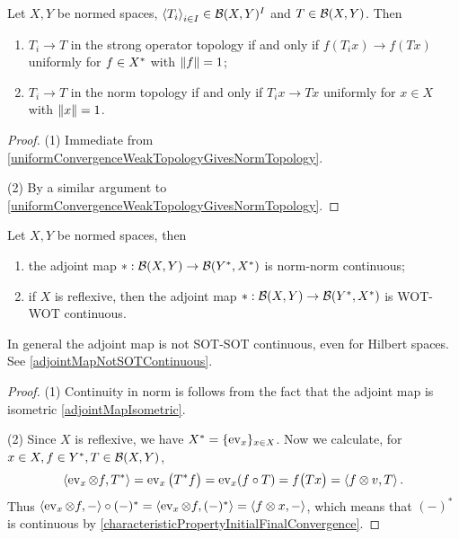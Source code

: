 \begin{lemma}
Let $X, Y$ be normed spaces, $\left\langle T_i \right\rangle_{i\in I} \in \operatorname{\mathcal{B}}(X, Y)^I$ and $T \in \operatorname{\mathcal{B}}(X, Y)$. Then
\begin{enumerate}
\item $T_i \to T$ in the strong operator topology \textup{if and only if} $f(T_ix) \to f(Tx)$ uniformly for $f\in{X}^*$ with $\lVert f\rVert = 1$;
\item $T_i \to T$ in the norm topology \textup{if and only if} $T_ix\to Tx$ uniformly for $x\in X$ with $\lVert x\rVert = 1$.
\end{enumerate}
\end{lemma}
\begin{proof}
(1) Immediate from \ref{uniformConvergenceWeakTopologyGivesNormTopology}.

(2) By a similar argument to \ref{uniformConvergenceWeakTopologyGivesNormTopology}.
\end{proof}

\begin{proposition}
Let $X,Y$ be normed spaces, then
\begin{enumerate}
\item the adjoint map $*: \operatorname{\mathcal{B}}(X, Y) \to \operatorname{\mathcal{B}}({Y}^*, {X}^*)$ is norm-norm continuous;
\item if $X$ is reflexive, then the adjoint map $*: \operatorname{\mathcal{B}}(X, Y) \to \operatorname{\mathcal{B}}({Y}^*, {X}^*)$ is WOT-WOT continuous.
\end{enumerate}
\end{proposition}
In general the adjoint map is not SOT-SOT continuous, even for Hilbert spaces. See \ref{adjointMapNotSOTContinuous}.
\begin{proof}
(1) Continuity in norm is follows from the fact that the adjoint map is isometric \ref{adjointMapIsometric}.

(2) Since $X$ is reflexive, we have ${X}^*= \{\operatorname{ev}_x\}_{x\in X}$. Now we calculate, for $x\in X, f\in {Y}^*, T\in \operatorname{\mathcal{B}}(X,Y)$,
\[ \left\langle \operatorname{ev}_x\otimes f, T^* \right\rangle = \operatorname{ev}_x\big(T^*f\big) = \operatorname{ev}_x(f\circ T) = f\big(Tx\big) = \left\langle f\otimes v, T \right\rangle. \]
Thus $\left\langle \operatorname{ev}_x\otimes f, - \right\rangle\circ (-)^* = \left\langle \operatorname{ev}_x\otimes f, (-)^* \right\rangle = \left\langle f\otimes x, - \right\rangle$, which means that $(-)^*$ is continuous by \ref{characteristicPropertyInitialFinalConvergence}.
\end{proof}

